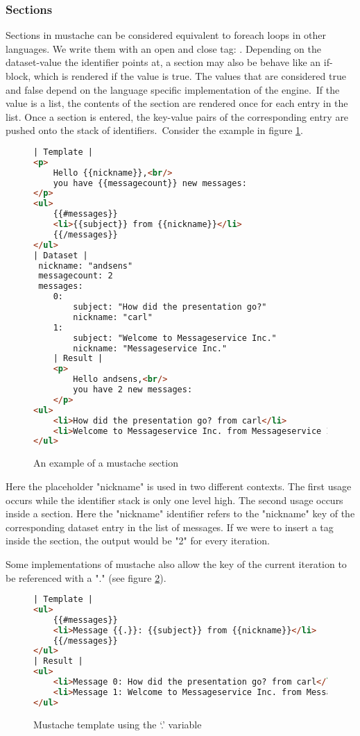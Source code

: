 \documentclass[thesis.tex]{subfiles}
\begin{document}
\subsubsection{Sections}
Sections in mustache can be considered equivalent to foreach loops in other
languages. We write them with an open and close tag:
.
Depending on the dataset-value the identifier points at, a section may also be
behave like an if-block, which is rendered if the value is true. The values that
are considered true and false depend on the language specific implementation
of the engine.\
If the value is a list, the contents of the section are rendered once for each
entry in the list. Once a section is entered, the key-value pairs of the
corresponding entry are pushed onto the stack of identifiers.\
Consider the example in figure \ref{fig:section.mustache}.
\begin{figure}
	\centering
	\caption{An example of a mustache section}
	\label{fig:section.mustache}
	\begin{lstlisting}[language=HTML]
| Template |
<p>
	Hello {{nickname}},<br/>
	you have {{messagecount}} new messages:
</p>
<ul>
	{{#messages}}
	<li>{{subject}} from {{nickname}}</li>
	{{/messages}}
</ul>
| Dataset |
 nickname: "andsens"
 messagecount: 2
 messages:
 	0:
 		subject: "How did the presentation go?"
 		nickname: "carl"
 	1:
 		subject: "Welcome to Messageservice Inc."
 		nickname: "Messageservice Inc."
	| Result |
	<p>
		Hello andsens,<br/>
		you have 2 new messages:
	</p>
<ul>
	<li>How did the presentation go? from carl</li>
	<li>Welcome to Messageservice Inc. from Messageservice Inc.</li>
</ul>
	\end{lstlisting}
\end{figure}
Here the placeholder "nickname" is used in two different contexts.
The first usage occurs while the identifier stack is only one level high.
The second usage occurs inside a section. Here the "nickname" identifier refers
to the "nickname" key of the corresponding dataset entry in the list of messages.
If we were to insert a \inline{\{\{messagecount\}\}} tag inside the section,
the output would be "2" for every iteration.

Some implementations of mustache also allow the key of the current iteration to
be referenced with a "." (see figure \ref{fig:dot-oper.mustache}).
\begin{figure}
	\centering
	\caption{Mustache template using the `.' variable}
	\label{fig:dot-oper.mustache}
	\begin{lstlisting}[language=HTML]
| Template |
<ul>
	{{#messages}}
	<li>Message {{.}}: {{subject}} from {{nickname}}</li>
	{{/messages}}
</ul>
| Result |
<ul>
	<li>Message 0: How did the presentation go? from carl</li>
	<li>Message 1: Welcome to Messageservice Inc. from Messageservice Inc.</li>
</ul>
	\end{lstlisting}
\end{figure}
\end{document}
